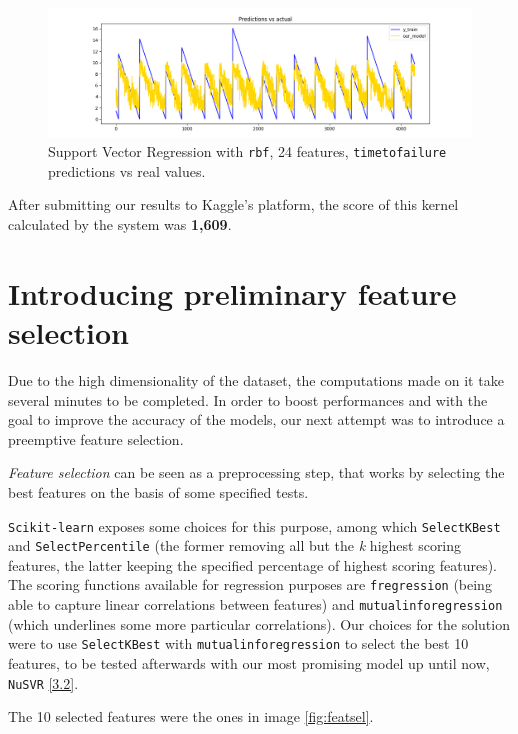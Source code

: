 \begin{figure} [h]
	\centering
	\includegraphics[width=1\linewidth]{pictures/nu_svr_24f.png}
	\caption{Support Vector Regression with \texttt{rbf}, 24 features, \texttt{time\textunderscore to\textunderscore failure} predictions vs real values.}
	\label{fig:SVR}
\end{figure}

After submitting our results to Kaggle's platform, the score of this kernel calculated by the system was \textbf{1,609}.

\section[Feature selection]{Introducing preliminary feature selection}
Due to the high dimensionality of the dataset, the computations made on it take several minutes to be completed. In order to boost performances and with the goal to improve the accuracy of the models, our next attempt was to introduce a preemptive feature selection.

\textit{Feature selection} can be seen as a preprocessing step, that works by selecting the best features on the basis of some specified tests.

\texttt{Scikit-learn} exposes some choices for this purpose, among which \texttt{SelectKBest} and \texttt{SelectPercentile} (the former removing all but the \textit{k} highest scoring features, the latter keeping the specified percentage of highest scoring features). The scoring functions available for regression purposes are \texttt{f\textunderscore regression} (being able to capture linear correlations between features) and \texttt{mutual\textunderscore info\textunderscore regression} (which underlines some more particular correlations). Our choices for the solution were to use \texttt{SelectKBest} with \texttt{mutual\textunderscore info\textunderscore regression} to select the best 10 features, to be tested afterwards with our most promising model up until now, \texttt{NuSVR} \ref{3.2}.

The 10 selected features were the ones in image \ref{fig:featsel}.

